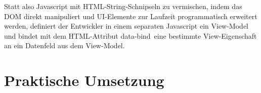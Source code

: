 \documentclass[bibtotoc]{scrreprt}
\begin{document}
Statt also Javascript mit HTML-String-Schnipseln zu vermischen, indem das DOM direkt manipuliert und UI-Elemente zur Laufzeit
programmatisch erweitert werden, definiert der Entwickler in einem separaten Javascript ein View-Model und bindet mit dem HTML-Attribut \glqq data-bind\grqq \ eine bestimmte View-Eigenschaft an ein Datenfeld aus dem View-Model.


\chapter{Praktische Umsetzung}


\end{document}
